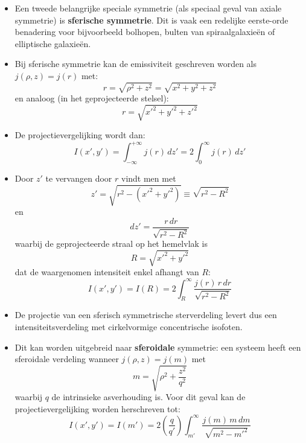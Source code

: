 \documentclass[10pt,a4paper]{article}
\renewenvironment{equation}{\begin{equation*}}{\end{equation*}}
\begin{document}
\begin{itemize}
  \item Een tweede belangrijke speciale symmetrie (als speciaal geval van axiale symmetrie) is \textbf{sferische symmetrie}. Dit is vaak een redelijke eerste-orde benadering voor bijvoorbeeld bolhopen, bulten van spiraalgalaxieën of elliptische galaxieën.
\end{itemize}

\begin{itemize}
  \item Bij sferische symmetrie kan de emissiviteit geschreven worden als $j(\rho,z)=j(r)$ met:
  \begin{equation}
    r = \sqrt{\rho^2+z^2} = \sqrt{x^2+y^2+z^2}
    \tag{2.19}
  \end{equation}
  en analoog (in het geprojecteerde stelsel):
  \begin{equation}
    r = \sqrt{x'^2+y'^2+z'^2}
    \tag{2.20}
  \end{equation}
  \item De projectievergelijking wordt dan:
  \begin{equation}
    I(x',y') = \int_{-\infty}^{+\infty} j(r)\,dz'
    = 2\int_{0}^{\infty} j(r)\,dz'
    \tag{2.21}
  \end{equation}
  \item Door $z'$ te vervangen door $r$ vindt men met
  \begin{equation}
    z' = \sqrt{r^2-(x'^2+y'^2)} \equiv \sqrt{r^2-R^2}
    \tag{2.22}
  \end{equation}
  en
  \begin{equation}
    dz' = \frac{r\,dr}{\sqrt{r^2-R^2}}
    \tag{2.23}
  \end{equation}
  waarbij de geprojecteerde straal op het hemelvlak is
  \begin{equation}
    R = \sqrt{x'^2+y'^2}
    \tag{2.24}
  \end{equation}
  dat de waargenomen intensiteit enkel afhangt van $R$:
  \begin{equation}
    I(x',y') = I(R) = 2\int_{R}^{\infty}\frac{j(r)\,r\,dr}{\sqrt{r^2-R^2}}
    \tag{2.25}
  \end{equation}
  \item De projectie van een sferisch symmetrische sterverdeling levert dus een intensiteitsverdeling met cirkelvormige concentrische isofoten.
  \item Dit kan worden uitgebreid naar \textbf{sferoidale} symmetrie: een systeem heeft een sferoidale verdeling wanneer $j(\rho,z)=j(m)$ met
  \begin{equation}
    m = \sqrt{\rho^2+\frac{z^2}{q^2}}
    \tag{2.26}
  \end{equation}
  waarbij $q$ de intrinsieke asverhouding is. Voor dit geval kan de projectievergelijking worden herschreven tot:
  \begin{equation}
    I(x',y') = I(m') = 2\left(\frac{q}{q'}\right)\int_{m'}^{\infty}\frac{j(m)\,m\,dm}{\sqrt{m^2-m'^2}}
    \tag{2.27}
  \end{equation}
\end{itemize}
\end{document}
